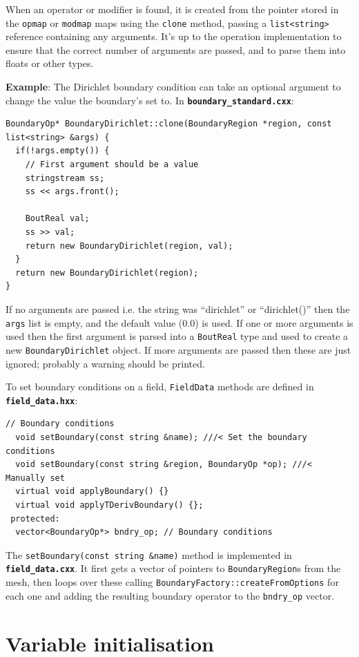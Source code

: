 \documentclass[12pt]{article}
\newcommand{\code}[1]{\texttt{#1}}
\newcommand{\file}[1]{\texttt{\bf #1}}
\begin{document}
When an operator or modifier is found, it is created from the pointer
stored in the \code{opmap} or \code{modmap} maps using the
\code{clone} method, passing
a \code{list<string>} reference containing any arguments. It's up
to the operation implementation to ensure that the correct number of
arguments are passed, and to parse them into floats or other types.

{\bf Example}: The Dirichlet boundary condition can take an optional
argument to change the value the boundary's set to. In \file{boundary\_standard.cxx}:
\begin{lstlisting}[firstnumber=13]
BoundaryOp* BoundaryDirichlet::clone(BoundaryRegion *region, const list<string> &args) {
  if(!args.empty()) {
    // First argument should be a value
    stringstream ss;
    ss << args.front();
    
    BoutReal val;
    ss >> val;
    return new BoundaryDirichlet(region, val);
  }
  return new BoundaryDirichlet(region);
}
\end{lstlisting}
If no arguments are passed i.e. the string was ``dirichlet'' or ``dirichlet()''
then the \code{args} list is empty, and the default value (0.0) is used.
If one or more arguments is used then the first argument is parsed into a
\code{BoutReal} type and used to create a new \code{BoundaryDirichlet} object.
If more arguments are passed then these are just ignored; probably a warning
should be printed.

To set boundary conditions on a field, \code{FieldData} methods are
defined in \file{field\_data.hxx}: 
\begin{lstlisting}
// Boundary conditions
  void setBoundary(const string &name); ///< Set the boundary conditions
  void setBoundary(const string &region, BoundaryOp *op); ///< Manually set
  virtual void applyBoundary() {}
  virtual void applyTDerivBoundary() {};
 protected:
  vector<BoundaryOp*> bndry_op; // Boundary conditions
\end{lstlisting}
The \code{setBoundary(const string \&name)} method is implemented in
\file{field\_data.cxx}. It first gets a vector of pointers to
\code{BoundaryRegion}s from the mesh, then loops over these calling
\code{BoundaryFactory::createFromOptions} for each one and adding the resulting
boundary operator to the \code{bndry\_op} vector.

\section{Variable initialisation}
\end{document}
